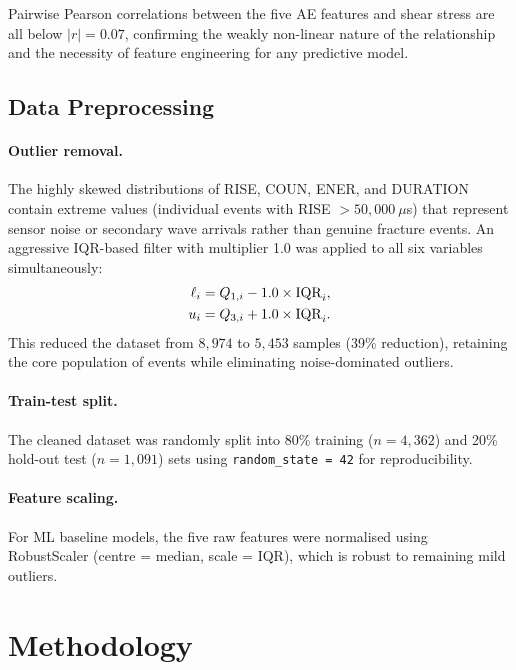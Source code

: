 \documentclass[12pt,a4paper]{article}
\begin{document}
Pairwise Pearson correlations between the five AE features and shear stress are
all below $|r| = 0.07$, confirming the weakly non-linear nature of the
relationship and the necessity of feature engineering for any predictive model.

\subsection{Data Preprocessing}
\label{subsec:preprocessing}

\paragraph{Outlier removal.}
The highly skewed distributions of RISE, COUN, ENER, and DURATION contain
extreme values (individual events with RISE $> 50{,}000~\mu$s) that represent
sensor noise or secondary wave arrivals rather than genuine fracture events. An
aggressive IQR-based filter with multiplier 1.0 was applied to all six variables
simultaneously:
\begin{align}
  \ell_i &= Q_{1,i} - 1.0 \times \mathrm{IQR}_i, \notag\\
  u_i    &= Q_{3,i} + 1.0 \times \mathrm{IQR}_i. \notag
\end{align}
This reduced the dataset from $8{,}974$ to $5{,}453$ samples (39\% reduction),
retaining the core population of events while eliminating noise-dominated
outliers.

\paragraph{Train-test split.}
The cleaned dataset was randomly split into 80\% training ($n = 4{,}362$) and
20\% hold-out test ($n = 1{,}091$) sets using \texttt{random\_state = 42} for
reproducibility.

\paragraph{Feature scaling.}
For ML baseline models, the five raw features were normalised using
RobustScaler (centre = median, scale = IQR), which is robust to remaining mild
outliers.

\section{Methodology}
\label{sec:methodology}
\end{document}
